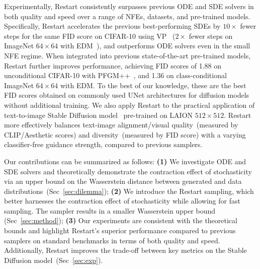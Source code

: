 Experimentally, Restart consistently surpasses previous ODE and SDE solvers in both quality and speed over a range of NFEs, datasets, and pre-trained models. Specifically, Restart accelerates the previous best-performing SDEs by $10\times$ fewer steps for the same FID score on CIFAR-10 using VP~\cite{Song2020ScoreBasedGM} ($2\times$ fewer steps on ImageNet $64\times 64$ with EDM~\cite{Karras2022ElucidatingTD}), and outperforms ODE solvers even in the small NFE regime. When integrated into previous state-of-the-art pre-trained models, Restart further improves performance, achieving FID scores of 1.88 on unconditional CIFAR-10 with PFGM++~\cite{Xu2023PFGMUT}, and 1.36 on class-conditional ImageNet $64\times 64$ with EDM. To the best of our knowledge, these are the best FID scores obtained on commonly used UNet architectures for diffusion models without additional training. We also apply Restart to the practical application of text-to-image Stable Diffusion model~\cite{Rombach2021HighResolutionIS} pre-trained on LAION $512\times 512$. Restart more effectively balances text-image alignment/visual quality~(measured by CLIP/Aesthetic scores) and diversity~(measured by FID score) with a varying classifier-free guidance strength, compared to previous samplers.

Our contributions can be summarized as follows: \textbf{(1)} We investigate ODE and SDE solvers and theoretically demonstrate the contraction effect of stochasticity via an upper bound on the Wasserstein distance between generated and data distributions~(Sec~\ref{sec:dilemma}); \textbf{(2)} We introduce the Restart sampling, which better harnesses the contraction effect of stochasticity while allowing for fast sampling. The sampler results in a smaller Wasserstein upper bound (Sec~\ref{sec:method}); \textbf{(3)} Our experiments are consistent with the theoretical bounds and highlight Restart's superior performance compared to previous samplers on standard benchmarks in terms of both quality and speed. Additionally, Restart improves the trade-off between key metrics on the Stable Diffusion model~(Sec~\ref{sec:exp}).


